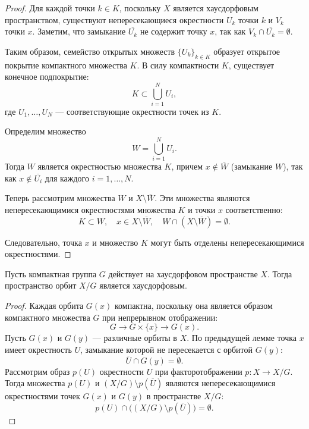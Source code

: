 \begin{proof}
Для каждой точки $ k \in K $, поскольку $ X $ является хаусдорфовым пространством, существуют непересекающиеся окрестности $ U_k $ точки $ k $ и $ V_k $ точки $ x $. Заметим, что замыкание $ \overline{U_k} $ не содержит точку $ x $, так как $ V_k \cap \overline{U_k} = \emptyset $.

Таким образом, семейство открытых множеств $ \{U_k\}_{k \in K} $ образует открытое покрытие компактного множества $ K $. В силу компактности $ K $, существует конечное подпокрытие:
\[
K \subset \bigcup_{i=1}^N U_i,
\]
где $ U_1, \ldots, U_N $ — соответствующие окрестности точек из $ K $.

Определим множество
\[
W = \bigcup_{i=1}^N U_i.
\]
Тогда $ W $ является окрестностью множества $ K $, причем $ x \notin \overline{W} $ (замыкание $ W $), так как $ x \notin \overline{U_i} $ для каждого $ i = 1, \ldots, N $.

Теперь рассмотрим множества $ W $ и $ X \setminus \overline{W} $. Эти множества являются непересекающимися окрестностями множества $ K $ и точки $ x $ соответственно:
\[
K \subset W, \quad x \in X \setminus \overline{W}, \quad W \cap (X \setminus \overline{W}) = \emptyset.
\]

Следовательно, точка $ x $ и множество $ K $ могут быть отделены непересекающимися окрестностями.
\end{proof}

\begin{theorem}
	Пусть компактная группа $ G $ действует на хаусдорфовом пространстве $ X $. Тогда пространство орбит $ X/G $ является хаусдорфовым.
	\end{theorem}
	
	\begin{proof}
	Каждая орбита $ G(x) $ компактна, поскольку она является образом компактного множества $ G $ при непрерывном отображении:
	   \[
	   G \to G \times \{x\} \to G(x).
	   \]
	Пусть $ G(x) $ и $ G(y) $ — различные орбиты в $ X $. По предыдущей лемме точка $ x $ имеет окрестность $ U $, замыкание которой не пересекается с орбитой $ G(y) $:
	   \[
	   \overline{U} \cap G(y) = \emptyset.
	   \]
	Рассмотрим образ $ p(U) $ окрестности $ U $ при факторотображении $ p: X \to X/G $. Тогда множества $ p(U) $ и $ (X/G) \setminus p(\overline{U}) $ являются непересекающимися окрестностями точек $ G(x) $ и $ G(y) $ в пространстве $ X/G $:
	   \[
	   p(U) \cap \big((X/G) \setminus p(\overline{U})\big) = \emptyset.
	   \]
	\end{proof}

